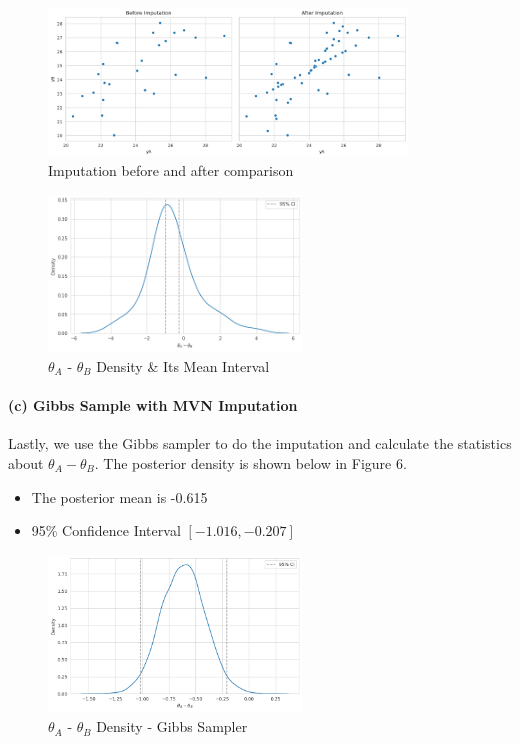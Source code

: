 \documentclass[11pt, letterpaper]{article}
\begin{document}
\begin{figure}[!h]
  \centering
  \includegraphics[width=0.85\textwidth]{2.a.png}
  \captionsetup{justification=centering}
  \caption{Imputation before and after comparison}
\end{figure}
\begin{figure}[!h]
  \centering
  \includegraphics[width=0.6\textwidth]{2.b.png}
  \captionsetup{justification=centering}
  \caption{$\theta_A$ - $\theta_B$ Density & Its Mean Interval}
\end{figure}

\paragraph{(c) Gibbs Sample with MVN Imputation}
Lastly, we use the Gibbs sampler to do the imputation and calculate the statistics about $\theta_A - \theta_B$. The posterior density is shown below in Figure 6.
\begin{itemize}
    \item The posterior mean is -0.615 
    \item 95\% Confidence Interval $[-1.016, -0.207]$
\end{itemize}
\begin{figure}[!h]
  \centering
  \includegraphics[width=0.6\textwidth]{2.c.png}
  \captionsetup{justification=centering}
  \caption{$\theta_A$ - $\theta_B$ Density - Gibbs Sampler}
\end{figure}
\end{document}
